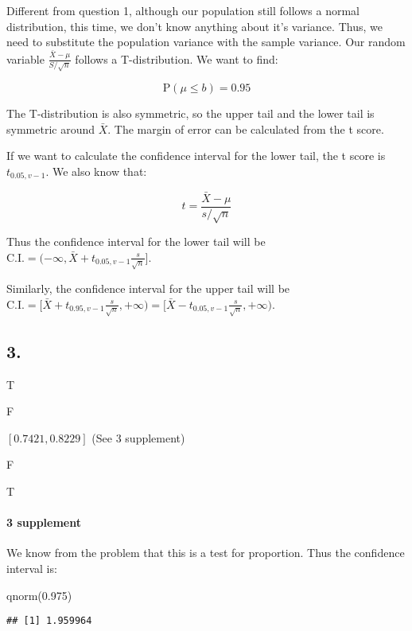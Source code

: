 \documentclass[
]{article}
\newenvironment{Shaded}{\begin{snugshade}}{\end{snugshade}}
\newcommand{\FloatTok}[1]{\textcolor[rgb]{0.00,0.00,0.81}{#1}}
\newcommand{\FunctionTok}[1]{\textcolor[rgb]{0.00,0.00,0.00}{#1}}
\newcommand{\NormalTok}[1]{#1}
\begin{document}
Different from question 1, although our population still follows a
normal distribution, this time, we don't know anything about it's
variance. Thus, we need to substitute the population variance with the
sample variance. Our random variable
\(\frac{\bar X - \mu}{S/ \sqrt{n}}\) follows a T-distribution. We want
to find:

\[
\text{P}(\mu \leq b) = 0.95
\]

The T-distribution is also symmetric, so the upper tail and the lower
tail is symmetric around \(\bar X\). The margin of error can be
calculated from the t score.

If we want to calculate the confidence interval for the lower tail, the
t score is \(t_{0.05, v - 1}\). We also know that:

\[
t = \frac{\bar X - \mu}{s / \sqrt{n}}
\]

Thus the confidence interval for the lower tail will be
\(\text{C.I.} = (- \infty, \bar X + t_{0.05,v-1} \frac{s}{\sqrt{n}}]\).

Similarly, the confidence interval for the upper tail will be
\(\text{C.I.} =[\bar X + t_{0.95,v-1} \frac{s}{\sqrt{n}}, + \infty)=[\bar X - t_{0.05,v-1} \frac{s}{\sqrt{n}}, + \infty)\).

\hypertarget{section}{%
\subsection{3.}\label{section}}

T

F

\([0.7421, 0.8229]\) (See 3 supplement)

F

T

\hypertarget{supplement}{%
\paragraph{3 supplement}\label{supplement}}

We know from the problem that this is a test for proportion. Thus the
confidence interval is:

\begin{Shaded}
\begin{Highlighting}[]
\FunctionTok{qnorm}\NormalTok{(}\FloatTok{0.975}\NormalTok{)}
\end{Highlighting}
\end{Shaded}

\begin{verbatim}
## [1] 1.959964
\end{verbatim}
\end{document}
